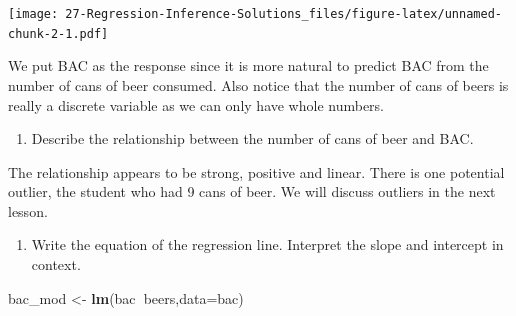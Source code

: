 \documentclass[
]{book}
\newenvironment{Shaded}{\begin{snugshade}}{\end{snugshade}}
\newcommand{\DataTypeTok}[1]{\textcolor[rgb]{0.13,0.29,0.53}{#1}}
\newcommand{\DecValTok}[1]{\textcolor[rgb]{0.00,0.00,0.81}{#1}}
\newcommand{\KeywordTok}[1]{\textcolor[rgb]{0.13,0.29,0.53}{\textbf{#1}}}
\newcommand{\NormalTok}[1]{#1}
\newcommand{\OperatorTok}[1]{\textcolor[rgb]{0.81,0.36,0.00}{\textbf{#1}}}
\newcommand{\StringTok}[1]{\textcolor[rgb]{0.31,0.60,0.02}{#1}}
\providecommand{\tightlist}{%
  \setlength{\itemsep}{0pt}\setlength{\parskip}{0pt}}
\begin{document}
\begin{Shaded}
\end{Shaded}

\texttt{[image: 27-Regression-Inference-Solutions\_files/figure-latex/unnamed-chunk-2-1.pdf]}

We put BAC as the response since it is more natural to predict BAC from the number of cans of beer consumed. Also notice that the number of cans of beers is really a discrete variable as we can only have whole numbers.

\begin{enumerate}
\def\labelenumi{\alph{enumi}.}
\setcounter{enumi}{1}
\tightlist
\item
  Describe the relationship between the number of cans of beer and BAC.
\end{enumerate}

The relationship appears to be strong, positive and linear. There is one potential outlier, the student who had 9 cans of beer. We will discuss outliers in the next lesson.

\begin{enumerate}
\def\labelenumi{\alph{enumi}.}
\setcounter{enumi}{2}
\tightlist
\item
  Write the equation of the regression line. Interpret the slope and intercept in context.
\end{enumerate}

\begin{Shaded}
\begin{Highlighting}[]
\NormalTok{bac_mod <-}\StringTok{ }\KeywordTok{lm}\NormalTok{(bac}\OperatorTok{~}\NormalTok{beers,}\DataTypeTok{data=}\NormalTok{bac)}
\end{Highlighting}
\end{Shaded}
\end{document}
